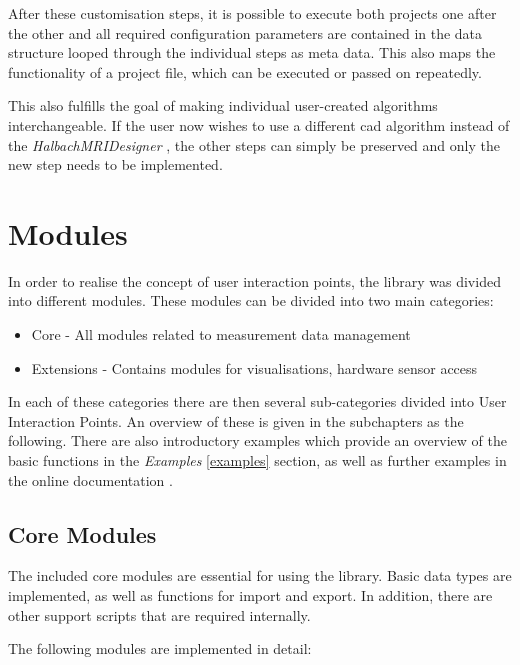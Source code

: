 After these customisation steps, it is possible to execute both projects
one after the other and all required configuration parameters are
contained in the data structure looped through the individual steps as
meta data. This also maps the functionality of a project file, which can
be executed or passed on repeatedly.

This also fulfills the goal of making individual user-created algorithms
interchangeable. If the user now wishes to use a different \gls{cad}
algorithm instead of the \emph{HalbachMRIDesigner}
\cite{HalbachMRIDesigner}, the other steps can simply be preserved
and only the new step needs to be implemented.

\hypertarget{modules}{%
\section{Modules}\label{modules}}

In order to realise the concept of user interaction points, the library
was divided into different modules. These modules can be divided into
two main categories:

\begin{itemize}
\tightlist
\item
  Core - All modules related to measurement data management
\item
  Extensions - Contains modules for visualisations, hardware sensor
  access
\end{itemize}

In each of these categories there are then several sub-categories
divided into User Interaction Points. An overview of these is given in
the subchapters as the following. There are also introductory examples
which provide an overview of the basic functions in the \emph{Examples}
\ref{examples} section, as well as further examples in the online
documentation \cite{MagneticReadoutProcessingReadTheDocs}.

\hypertarget{core-modules}{%
\subsection{Core Modules}\label{core-modules}}

The included core modules are essential for using the library. Basic
data types are implemented, as well as functions for import and export.
In addition, there are other support scripts that are required
internally.

The following modules are implemented in detail:

